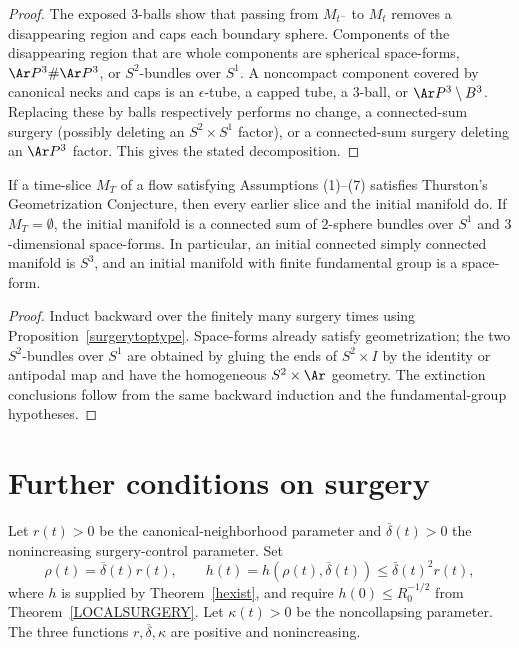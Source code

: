 \begin{proof}
\sketch
{}
The exposed $3$-balls show that passing from $M_{t^-}$ to $M_t$ removes a
disappearing region and caps each boundary sphere. Components of the disappearing
region that are whole components are spherical space-forms,
$\Ar P^3\#\Ar P^3$, or $S^2$-bundles over $S^1$. A noncompact component covered
by canonical necks and caps is an $\epsilon$-tube, a capped tube, a $3$-ball,
or $\Ar P^3\setminus B^3$. Replacing these by balls respectively performs no
change, a connected-sum surgery (possibly deleting an $S^2\times S^1$ factor),
or a connected-sum surgery deleting an $\Ar P^3$ factor. This gives the stated
decomposition.
\end{proof}

\begin{corollary}
\label{cor:geometrization-inherited-across-surgery}
\label{Tgood0good}
If a time-slice $M_T$ of a flow satisfying Assumptions (1)--(7) satisfies
Thurston's Geometrization Conjecture, then every earlier slice and the initial
manifold do. If $M_T=\emptyset$, the initial manifold is a connected sum of
$2$-sphere bundles over $S^1$ and $3$-dimensional space-forms. In particular,
an initial connected simply connected manifold is $S^3$, and an initial
manifold with finite fundamental group is a space-form.
\end{corollary}

\begin{proof}
\sketch
Induct backward over the finitely many surgery times using
Proposition~\ref{surgerytoptype}. Space-forms already satisfy geometrization;
the two $S^2$-bundles over $S^1$ are obtained by gluing the ends of
$S^2\times I$ by the identity or antipodal map and have the homogeneous
$S^2\times\Ar$ geometry. The extinction conclusions follow from the same
backward induction and the fundamental-group hypotheses.
\end{proof}

\section{Further conditions on surgery}

\begin{definition}
\label{def:surgery-scale-function}
\label{hrestricted}
Let $r(t)>0$ be the canonical-neighborhood parameter and
$\overline\delta(t)>0$ the nonincreasing surgery-control parameter. Set
\[
  \rho(t)=\overline\delta(t)r(t),
  \qquad
  h(t)=h(\rho(t),\overline\delta(t))
  \leq\overline\delta(t)^2r(t),
\]
where $h$ is supplied by Theorem~\ref{hexist}, and require
$h(0)\leq R_0^{-1/2}$ from Theorem~\ref{LOCALSURGERY}. Let
$\kappa(t)>0$ be the noncollapsing parameter. The three functions
$r,\overline\delta,\kappa$ are positive and nonincreasing.
\end{definition}


